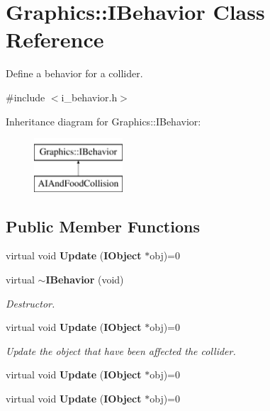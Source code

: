 \section{Graphics\+:\+:I\+Behavior Class Reference}
\label{class_graphics_1_1_i_behavior}


Define a behavior for a collider.  




{\ttfamily \#include $<$i\+\_\+behavior.\+h$>$}

Inheritance diagram for Graphics\+:\+:I\+Behavior\+:\begin{figure}[H]
\begin{center}
\leavevmode
\includegraphics[height=2.000000cm]{class_graphics_1_1_i_behavior}
\end{center}
\end{figure}
\subsection*{Public Member Functions}
\begin{DoxyCompactItemize}
\item 
virtual void {\bfseries Update} ({\bf I\+Object} $\ast$obj)=0\label{class_graphics_1_1_i_behavior_ac341180608014d8ec54c2b775881c191}

\item 
virtual {\bf $\sim$\+I\+Behavior} (void)\label{class_graphics_1_1_i_behavior_a7b7335a435db0c76fc0b596792d3a905}

\begin{DoxyCompactList}\small\item\em Destructor. \end{DoxyCompactList}\item 
virtual void {\bf Update} ({\bf I\+Object} $\ast$obj)=0
\begin{DoxyCompactList}\small\item\em Update the object that have been affected the collider. \end{DoxyCompactList}\item 
virtual void {\bfseries Update} ({\bf I\+Object} $\ast$obj)=0\label{class_graphics_1_1_i_behavior_ac341180608014d8ec54c2b775881c191}

\item 
virtual void {\bfseries Update} ({\bf I\+Object} $\ast$obj)=0\label{class_graphics_1_1_i_behavior_ac341180608014d8ec54c2b775881c191}

\end{DoxyCompactItemize}


